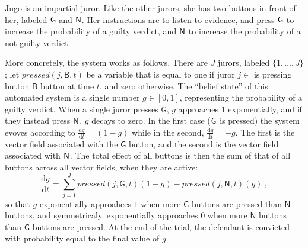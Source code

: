 \begin{example}\label{ex:jugo}
\def\pressed(#1,#2,#3){\mathit{pressed}(#1,\mathsf{#2},#3)}
Jugo is an impartial juror.
Like the other jurors, she has two buttons in front of her,
labeled $\sf G$ and $\sf N$.
Her instructions are to listen to evidence, and press $\sf G$ to 
increase the probability of a guilty verdict, and $\sf N$ 
to increase the probability of a not-guilty verdict.

More concretely, the system works as follows.
There are $J$ jurors, labeled $\{1, \ldots, J\}$;
let 
$\pressed(j,B,t)$ be
a variable that is equal to one if juror $j \in $
is pressing button  $\mathsf B$ button at time $t$, and zero otherwise.
The ``belief state'' of this automated system is
a single number $g \in [0,1]$, representing the probability of a guilty verdict.
When a single juror presses $\mathsf G$, $g$ approaches 1
exponentially, and if they instead press $\sf N$, $g$ decays to zero.
In the first case ($\sf G$ is pressed) the system evoves according to 
$\frac{\mathrm dg}{\mathrm dt} = (1-g)$
while in the second, 
$\frac{\mathrm dg}{\mathrm dt} = -g$.
The first is the vector field associated with the $\mathsf G$ button,
and the second is the vector field associated with $\sf N$. 
The total effect of all buttons is then the sum of that of all buttons across all vector fields, when they are active:
\[
	\frac{\mathrm dg}{\mathrm dt} = 
	\sum_{j = 1}^J 
		\pressed(j,G,t)
		(1-g) 
		-
		\pressed(j,N,t)
		(g)
		~,
\]
so that $g$ exponentially approahces $1$ when more $\mathsf G$ buttons are pressed than $\mathsf N$ buttons,
and symmetricaly, exponentially approaches $0$ when more $\mathsf N$ buttons than $\mathsf G$ buttons are pressed.
At the end of the trial, the defendant is convicted with probability
equal to the final value of $g$. 


\end{example}
